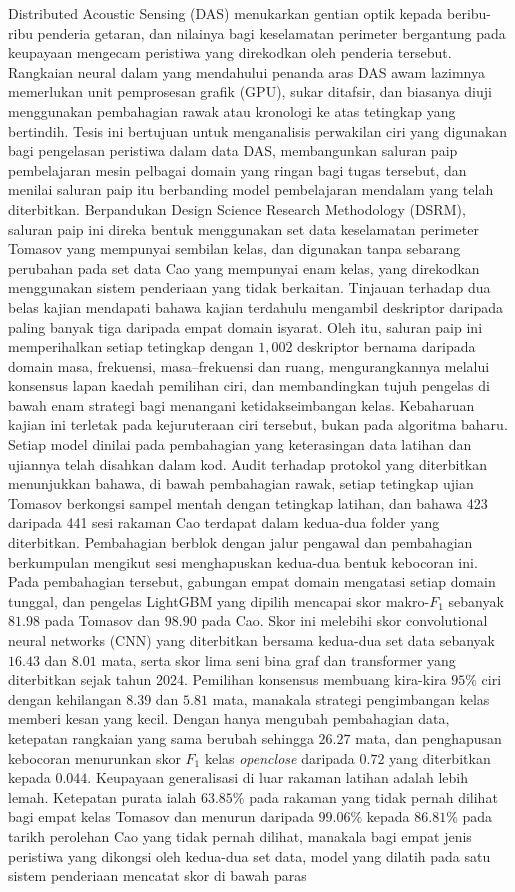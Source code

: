 Distributed Acoustic Sensing (DAS) menukarkan gentian optik kepada beribu-ribu penderia getaran, dan nilainya bagi keselamatan perimeter bergantung pada keupayaan mengecam peristiwa yang direkodkan oleh penderia tersebut. Rangkaian neural dalam yang mendahului penanda aras DAS awam lazimnya memerlukan unit pemprosesan grafik (GPU), sukar ditafsir, dan biasanya diuji menggunakan pembahagian rawak atau kronologi ke atas tetingkap yang bertindih. Tesis ini bertujuan untuk menganalisis perwakilan ciri yang digunakan bagi pengelasan peristiwa dalam data DAS, membangunkan saluran paip pembelajaran mesin pelbagai domain yang ringan bagi tugas tersebut, dan menilai saluran paip itu berbanding model pembelajaran mendalam yang telah diterbitkan. Berpandukan Design Science Research Methodology (DSRM), saluran paip ini direka bentuk menggunakan set data keselamatan perimeter Tomasov yang mempunyai sembilan kelas, dan digunakan tanpa sebarang perubahan pada set data Cao yang mempunyai enam kelas, yang direkodkan menggunakan sistem penderiaan yang tidak berkaitan. Tinjauan terhadap dua belas kajian mendapati bahawa kajian terdahulu mengambil deskriptor daripada paling banyak tiga daripada empat domain isyarat. Oleh itu, saluran paip ini memperihalkan setiap tetingkap dengan $1{,}002$ deskriptor bernama daripada domain masa, frekuensi, masa--frekuensi dan ruang, mengurangkannya melalui konsensus lapan kaedah pemilihan ciri, dan membandingkan tujuh pengelas di bawah enam strategi bagi menangani ketidakseimbangan kelas. Kebaharuan kajian ini terletak pada kejuruteraan ciri tersebut, bukan pada algoritma baharu. Setiap model dinilai pada pembahagian yang keterasingan data latihan dan ujiannya telah disahkan dalam kod. Audit terhadap protokol yang diterbitkan menunjukkan bahawa, di bawah pembahagian rawak, setiap tetingkap ujian Tomasov berkongsi sampel mentah dengan tetingkap latihan, dan bahawa 423 daripada 441 sesi rakaman Cao terdapat dalam kedua-dua folder yang diterbitkan. Pembahagian berblok dengan jalur pengawal dan pembahagian berkumpulan mengikut sesi menghapuskan kedua-dua bentuk kebocoran ini. Pada pembahagian tersebut, gabungan empat domain mengatasi setiap domain tunggal, dan pengelas LightGBM yang dipilih mencapai skor makro-$F_1$ sebanyak $81.98$ pada Tomasov dan $98.90$ pada Cao. Skor ini melebihi skor convolutional neural networks (CNN) yang diterbitkan bersama kedua-dua set data sebanyak $16.43$ dan $8.01$ mata, serta skor lima seni bina graf dan transformer yang diterbitkan sejak tahun 2024. Pemilihan konsensus membuang kira-kira $95\%$ ciri dengan kehilangan $8.39$ dan $5.81$ mata, manakala strategi pengimbangan kelas memberi kesan yang kecil. Dengan hanya mengubah pembahagian data, ketepatan rangkaian yang sama berubah sehingga $26.27$ mata, dan penghapusan kebocoran menurunkan skor $F_1$ kelas \emph{openclose} daripada $0.72$ yang diterbitkan kepada $0.044$. Keupayaan generalisasi di luar rakaman latihan adalah lebih lemah. Ketepatan purata ialah $63.85\%$ pada rakaman yang tidak pernah dilihat bagi empat kelas Tomasov dan menurun daripada $99.06\%$ kepada $86.81\%$ pada tarikh perolehan Cao yang tidak pernah dilihat, manakala bagi empat jenis peristiwa yang dikongsi oleh kedua-dua set data, model yang dilatih pada satu sistem penderiaan mencatat skor di bawah paras 